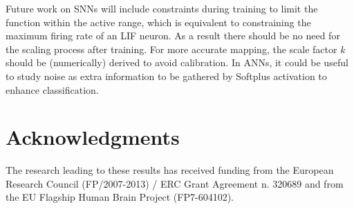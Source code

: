 \documentclass[runningheads,a4paper]{llncs}
\begin{document}
	Future work on SNNs will include constraints during training to limit the function within the active range, which is equivalent to constraining the maximum firing rate of an LIF neuron.
	As a result there should be no need for the scaling process after training.
	For more accurate mapping, the scale factor $k$ should be (numerically) derived to avoid calibration.
	In ANNs, it could be useful to study noise as extra information to be gathered by Softplus activation to enhance classification.
	
	
	\section*{Acknowledgments}
	
	The research leading to these results has received funding from the European Research Council 
	(FP/2007-2013) / ERC Grant Agreement n. 320689 and from the EU Flagship Human Brain Project (FP7-604102). 
	
\end{document}
